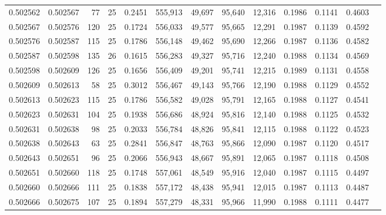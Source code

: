 \begin{tabular}{rrrrrrrrrrrrr}
0.502562 & 0.502567 &  77 &  25 &                                     0.2451 & 555,913 &  49,697 &  95,640 &  12,316 & 0.1986 & 0.1141 & 0.4603 \\
0.502567 & 0.502576 & 120 &  25 &                                     0.1724 & 556,033 &  49,577 &  95,665 &  12,291 & 0.1987 & 0.1139 & 0.4592 \\
0.502576 & 0.502587 & 115 &  25 &                                     0.1786 & 556,148 &  49,462 &  95,690 &  12,266 & 0.1987 & 0.1136 & 0.4582 \\
0.502587 & 0.502598 & 135 &  26 &                                     0.1615 & 556,283 &  49,327 &  95,716 &  12,240 & 0.1988 & 0.1134 & 0.4569 \\
0.502598 & 0.502609 & 126 &  25 &                                     0.1656 & 556,409 &  49,201 &  95,741 &  12,215 & 0.1989 & 0.1131 & 0.4558 \\
0.502609 & 0.502613 &  58 &  25 &                                     0.3012 & 556,467 &  49,143 &  95,766 &  12,190 & 0.1988 & 0.1129 & 0.4552 \\
0.502613 & 0.502623 & 115 &  25 &                                     0.1786 & 556,582 &  49,028 &  95,791 &  12,165 & 0.1988 & 0.1127 & 0.4541 \\
0.502623 & 0.502631 & 104 &  25 &                                     0.1938 & 556,686 &  48,924 &  95,816 &  12,140 & 0.1988 & 0.1125 & 0.4532 \\
0.502631 & 0.502638 &  98 &  25 &                                     0.2033 & 556,784 &  48,826 &  95,841 &  12,115 & 0.1988 & 0.1122 & 0.4523 \\
0.502638 & 0.502643 &  63 &  25 &                                     0.2841 & 556,847 &  48,763 &  95,866 &  12,090 & 0.1987 & 0.1120 & 0.4517 \\
0.502643 & 0.502651 &  96 &  25 &                                     0.2066 & 556,943 &  48,667 &  95,891 &  12,065 & 0.1987 & 0.1118 & 0.4508 \\
0.502651 & 0.502660 & 118 &  25 &                                     0.1748 & 557,061 &  48,549 &  95,916 &  12,040 & 0.1987 & 0.1115 & 0.4497 \\
0.502660 & 0.502666 & 111 &  25 &                                     0.1838 & 557,172 &  48,438 &  95,941 &  12,015 & 0.1987 & 0.1113 & 0.4487 \\
0.502666 & 0.502675 & 107 &  25 &                                     0.1894 & 557,279 &  48,331 &  95,966 &  11,990 & 0.1988 & 0.1111 & 0.4477 \\

\end{tabular}
